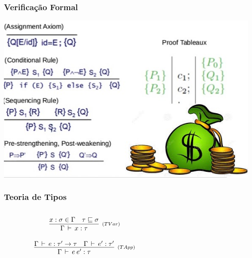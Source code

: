 \documentclass{beamer}
\begin{document}
\begin{frame}
   \frametitle{Verificação Formal}
   \includegraphics[scale=0.5]{img/hoarelogic}
\end{frame}

\begin{frame}
  \frametitle{Teoria de Tipos}
	\begin{columns}[T]
		\begin{column}{.5\textwidth}
                   \[
                        \begin{array}{c}
                        \infer[_{(TVar)}]{\Gamma\,\vdash\,x : \tau}
                                             {x: \sigma \in \Gamma &
                                                                     \tau
                                                                     \sqsubseteq
                                                                     \sigma}
                          \\ \\
                        \infer[_{(TApp)}]{\Gamma\,\vdash\,e\:e' :\tau}
                                             {\Gamma\,\vdash\,e :\tau'
                                               \to \tau &
                                              \Gamma\,\vdash\,e':\tau'}
                       \end{array}
                   \]
		\end{column}
		\begin{column}{.5\textwidth}
			\begin{quote}
			\end{quote}
		\end{column}
	\end{columns}
\end{frame}
\end{document}
